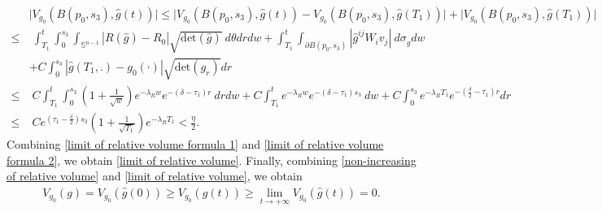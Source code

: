 \documentclass[12pt]{amsart}
\begin{document}
\begin{equation}\label{limit of relative volume formula 2}
    \begin{split}
        &\Big| V_{g_0}(B(p_0, s_3), \hat{g}(t))\Big| \leq\Big| V_{g_0}(B(p_0, s_3), \hat{g}(t)) - V_{g_0}(B(p_0, s_3), \hat{g}(T_1)) \Big| + \Big|V_{g_0}(B(p_0, s_3), \hat{g}(T_1)) \Big|\\
        \leq&\; \int_{T_1}^{t}\int_{0}^{s_3}\int_{\mathbb{S}^{n - 1}}|R(\hat{g}) - R_0|\sqrt{\mathrm{det}(\hat{g})}\ d\theta dr dw + \int_{T_1}^{t} \int_{\partial B(p_0, s_3)} |\hat{g}^{ij}W_i v_j|\ d\sigma_{\hat{g}}dw\\
        &+ C\int_{0}^{s_3}|\hat{g}(T_1, .) - g_0(\cdot)|\sqrt{\mathrm{det}(g_r)} dr\\
        \leq&\;C\int_{T_1}^{t}\int_{0}^{s_3}(1 + \frac{1}{\sqrt{w}}) e^{-\lambda_R w} e^{-(\delta - \tau_1)r}\ drdw + C\int_{T_1}^{t}e^{-\lambda_R w}e^{-(\delta - \tau_1)s_3}\ dw + C\int_{0}^{s_3} e^{-\lambda_R T_1}e^{-(\frac{\delta}{2} - \tau_1)r} dr\\
        \leq&\; C e^{(\tau_1 - \frac{\delta}{2})s_3}(1 + \frac{1}{\sqrt{T_1}})e^{-\lambda_R T_1} < \frac{\eta}{2}.
    \end{split}
\end{equation}
Combining \eqref{limit of relative volume formula 1} and \eqref{limit of relative volume formula 2}, we obtain \eqref{limit of relative volume}. Finally, combining \eqref{non-increasing of relative volume} and \eqref{limit of relative volume}, we obtain
\begin{align}\label{positive volume}
    V_{g_0}(g) = V_{g_0}(\hat{g}(0)) \geq V_{g_0}(\hat{g}(t)) \geq \lim_{t\rightarrow +\infty} V_{g_0}(\hat{g}(t)) = 0. 
\end{align}
\end{document}
